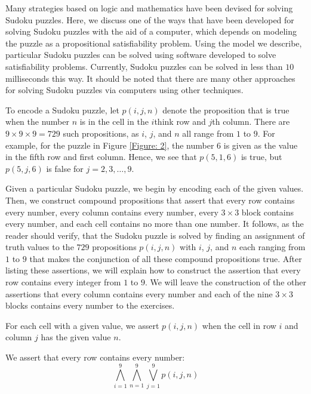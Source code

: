\documentclass{Axon}
\begin{document}
\begin{example}
    Many strategies based on logic and mathematics have been devised for solving Sudoku puzzles. Here, we discuss one of the ways that have been developed for solving Sudoku puzzles with the aid of a computer, which depends on modeling the puzzle as a propositional  satisfiability problem. Using the model we describe, particular Sudoku puzzles can be solved using software developed to solve satisfiability problems. Currently, Sudoku puzzles can be solved in less than \(10\) milliseconds this way. It should be noted that there are many other approaches for solving Sudoku puzzles via computers using other techniques.

    To encode a Sudoku puzzle, let \(p(i, j, n)\) denote the proposition that is true when the number \(n\) is in the cell in the \(i\)think row and \(j\)th column. There are \(9 \times 9 \times 9 = 729\) such propositions, as \(i\), \(j\), and \(n\) all range from \(1\) to \(9\). For example, for the puzzle in Figure \ref{Figure: 2}, the number \(6\) is given as the value in the fifth row and first column. Hence, we see that \(p(5, 1, 6)\) is true, but \(p(5, j, 6)\) is false for \(j = 2, 3, \ldots, 9\).

    Given a particular Sudoku puzzle, we begin by encoding each of the given values. Then, we construct compound propositions that assert that every row contains every number, every column contains every number, every \(3 \times 3\) block contains every number, and each cell contains no more than one number. It follows, as the reader should verify, that the Sudoku puzzle is solved by finding an assignment of truth values to the \(729\) propositions \(p(i, j, n)\) with \(i\), \(j\), and \(n\) each ranging from \(1\) to \(9\) that makes the conjunction of all these compound propositions true. After listing these assertions, we will explain how to construct the assertion that every row contains every integer from \(1\) to \(9\). We will leave the construction of the other assertions that every column contains every number and each of the nine \(3 \times 3\) blocks contains every number to the exercises.

    \begin{center}
        For each cell with a given value, we assert \(p(i, j, n)\) when the cell in row \(i\) and column \(j\) has the given value \(n\).
    \end{center}
    
    \begin{center}
        We assert that every row contains every number:
        \begin{equation*}
            \bigwedge_{i = 1}^9 \bigwedge_{n = 1}^9 \bigvee_{j = 1}^9 p(i, j, n)
        \end{equation*}
    \end{center}


\end{example}
\end{document}
